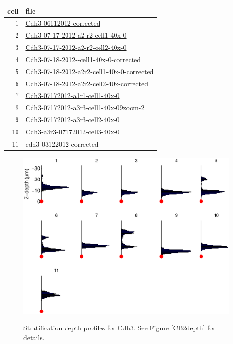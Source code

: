 \documentclass{article}
\renewenvironment{table}[1][ht]{\comment}{\endcomment}
\begin{document}
\begin{table}
  \centering
  \begin{tabular}{rl}
    \toprule
    cell & file \\
    \midrule
    1& \url{Cdh3-06112012-corrected} \\
    2& \url{Cdh3-07-17-2012-a2-r2-cell1-40x-0} \\
    3& \url{Cdh3-07-17-2012-a2-r2-cell2-40x-0} \\
    4& \url{Cdh3-07-18-2012--cell1-40x-0-corrected} \\
    5& \url{Cdh3-07-18-2012-a2r2-cell1-40x-0-corrected} \\
    6& \url{Cdh3-07-18-2012-a2r2-cell2-40x-corrected} \\
    7& \url{Cdh3-07172012-a1r1-cell1-40x-0} \\
    8& \url{Cdh3-07172012-a3r3-cell1-40x-09zoom-2} \\
    9& \url{Cdh3-07172012-a3r3-cell2-40x-0} \\
    10& \url{Cdh3-a3r3-07172012-cell3-40x-0} \\
    11& \url{cdh3-03122012-corrected} \\
    \bottomrule
  \end{tabular}
  \caption{List of Cdh3 file names in data set. \label{Cdh3filenames}}
\end{table}




\begin{figure}
  \centering
  {\includegraphics[scale=1]{Figures/SupFig2/Cdh3-stratification-depth-1}}
  \caption{Stratification depth profiles for Cdh3. See Figure
    \ref{CB2depth} for details.}
\end{figure}
\end{document}
